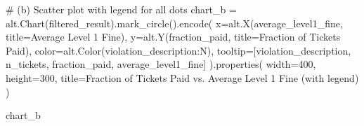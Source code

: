 \documentclass[
  letterpaper,
  DIV=11,
  numbers=noendperiod]{scrartcl}
\newenvironment{Shaded}{\begin{snugshade}}{\end{snugshade}}
\newcommand{\CommentTok}[1]{\textcolor[rgb]{0.37,0.37,0.37}{#1}}
\newcommand{\DecValTok}[1]{\textcolor[rgb]{0.68,0.00,0.00}{#1}}
\newcommand{\NormalTok}[1]{\textcolor[rgb]{0.00,0.23,0.31}{#1}}
\newcommand{\OperatorTok}[1]{\textcolor[rgb]{0.37,0.37,0.37}{#1}}
\newcommand{\StringTok}[1]{\textcolor[rgb]{0.13,0.47,0.30}{#1}}
\begin{document}
\begin{Shaded}
\begin{Highlighting}[]
\CommentTok{\# (b) Scatter plot with legend for all dots}
\NormalTok{chart\_b }\OperatorTok{=}\NormalTok{ alt.Chart(filtered\_result).mark\_circle().encode(}
\NormalTok{    x}\OperatorTok{=}\NormalTok{alt.X(}\StringTok{\textquotesingle{}average\_level1\_fine\textquotesingle{}}\NormalTok{, title}\OperatorTok{=}\StringTok{\textquotesingle{}Average Level 1 Fine\textquotesingle{}}\NormalTok{),}
\NormalTok{    y}\OperatorTok{=}\NormalTok{alt.Y(}\StringTok{\textquotesingle{}fraction\_paid\textquotesingle{}}\NormalTok{, title}\OperatorTok{=}\StringTok{\textquotesingle{}Fraction of Tickets Paid\textquotesingle{}}\NormalTok{),}
\NormalTok{    color}\OperatorTok{=}\NormalTok{alt.Color(}\StringTok{\textquotesingle{}violation\_description:N\textquotesingle{}}\NormalTok{),}
\NormalTok{    tooltip}\OperatorTok{=}\NormalTok{[}\StringTok{\textquotesingle{}violation\_description\textquotesingle{}}\NormalTok{, }\StringTok{\textquotesingle{}n\_tickets\textquotesingle{}}\NormalTok{, }\StringTok{\textquotesingle{}fraction\_paid\textquotesingle{}}\NormalTok{, }\StringTok{\textquotesingle{}average\_level1\_fine\textquotesingle{}}\NormalTok{]}
\NormalTok{).properties(}
\NormalTok{    width}\OperatorTok{=}\DecValTok{400}\NormalTok{,}
\NormalTok{    height}\OperatorTok{=}\DecValTok{300}\NormalTok{,}
\NormalTok{    title}\OperatorTok{=}\StringTok{\textquotesingle{}Fraction of Tickets Paid vs. Average Level 1 Fine (with legend)\textquotesingle{}}
\NormalTok{)}

\NormalTok{chart\_b}
\end{Highlighting}
\end{Shaded}
\end{document}
